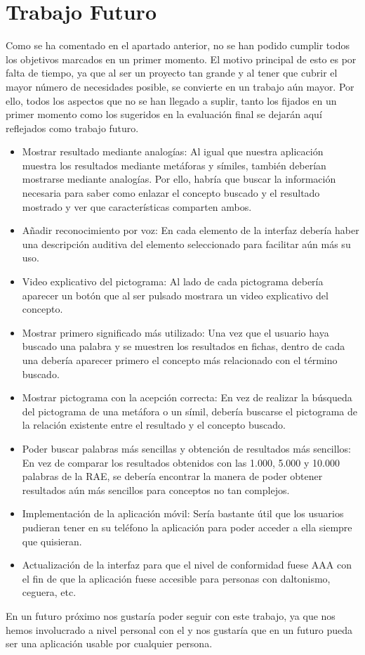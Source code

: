 	

\section{Trabajo Futuro}
\label{cap:sec:TrabajoFuturo}

Como se ha comentado en el apartado anterior, no se han podido cumplir todos los objetivos marcados en un primer momento. El motivo principal de esto es por falta de tiempo, ya que al ser un proyecto tan grande y al tener que cubrir el mayor número de necesidades posible, se convierte en un trabajo aún mayor.
Por ello, todos los aspectos que no se han llegado a suplir, tanto los fijados en un primer momento como los sugeridos en la evaluación final se dejarán aquí reflejados como trabajo futuro. 

\begin{itemize}
	\item Mostrar resultado mediante analogías: Al igual que nuestra aplicación muestra los resultados mediante metáforas y símiles, también deberían mostrarse mediante analogías. Por ello, habría que buscar la información necesaria para saber como enlazar el concepto buscado y el resultado mostrado y ver que características comparten ambos.
	\item Añadir reconocimiento por voz: En cada elemento de la interfaz debería haber una descripción auditiva del elemento seleccionado para facilitar aún más su uso.
	\item Video explicativo del pictograma: Al lado de cada pictograma debería aparecer un botón que al ser pulsado mostrara un video explicativo del concepto.
	\item Mostrar primero significado más utilizado: Una vez que el usuario haya buscado una palabra y se muestren los resultados en fichas, dentro de cada una debería aparecer primero el concepto más relacionado con el término buscado.
	\item Mostrar pictograma con la acepción correcta: En vez de realizar la búsqueda del pictograma de una metáfora o un símil, debería buscarse el pictograma de la relación existente entre el resultado y el concepto buscado.
	\item Poder buscar palabras más sencillas y obtención de resultados más sencillos: En vez de comparar los resultados obtenidos con las 1.000, 5.000 y 10.000 palabras de la RAE, se debería encontrar la manera de poder obtener resultados aún más sencillos para conceptos no tan complejos.
	\item Implementación de la aplicación móvil: Sería bastante útil que los usuarios pudieran tener en su teléfono la aplicación para poder acceder a ella siempre que quisieran.
	\item Actualización de la interfaz para que el nivel de conformidad fuese AAA con el fin de que la aplicación fuese accesible para personas con daltonismo, ceguera, etc.
	
	
\end{itemize}


En un futuro próximo nos gustaría poder seguir con este trabajo, ya que nos hemos involucrado a nivel personal con el y nos gustaría que en un futuro pueda ser una aplicación usable por cualquier persona.

